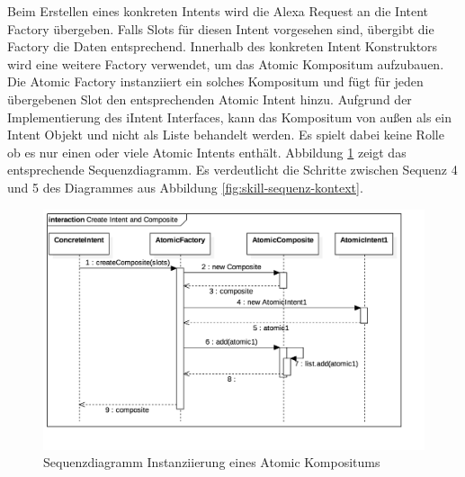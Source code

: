 Beim Erstellen eines konkreten Intents wird die Alexa Request an die Intent Factory übergeben. Falls Slots für diesen Intent vorgesehen sind, übergibt die Factory die Daten entsprechend. Innerhalb des konkreten Intent Konstruktors wird eine weitere Factory verwendet, um das Atomic Kompositum aufzubauen. Die Atomic Factory instanziiert ein solches Kompositum und fügt für jeden übergebenen Slot den entsprechenden Atomic Intent hinzu. Aufgrund der Implementierung des iIntent Interfaces, kann das Kompositum von außen als ein Intent Objekt und nicht als Liste behandelt werden. Es spielt dabei keine Rolle ob es nur einen oder viele Atomic Intents enthält. Abbildung \ref{fig:skill-sequenz-kompositum} zeigt das entsprechende Sequenzdiagramm. Es verdeutlicht die Schritte zwischen Sequenz 4 und 5 des Diagrammes aus Abbildung \ref{fig:skill-sequenz-kontext}.\newpage

\begin{figure}[!htb]
    \centering
    \includegraphics[width=1.0\textwidth]{bilder/4_skillSequenzIntentKompositum.png}
    \caption{Sequenzdiagramm Instanziierung eines Atomic Kompositums}
    \label{fig:skill-sequenz-kompositum}
\end{figure}

